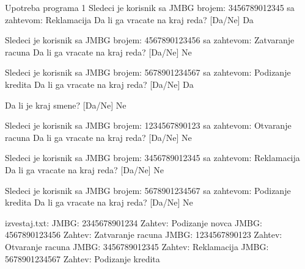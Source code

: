 \begin{Exercise}[label=606]
\begin{maxitest}
\begin{test}{Upotreba programa 1}
Sledeci je korisnik sa JMBG brojem: 3456789012345
sa zahtevom: Reklamacija
        Da li ga vracate na kraj reda? [Da/Ne] Da

Sledeci je korisnik sa JMBG brojem: 4567890123456
sa zahtevom: Zatvaranje racuna
        Da li ga vracate na kraj reda? [Da/Ne] Ne

Sledeci je korisnik sa JMBG brojem: 5678901234567
sa zahtevom: Podizanje kredita
        Da li ga vracate na kraj reda? [Da/Ne] Da

Da li je kraj smene? [Da/Ne] Ne

Sledeci je korisnik sa JMBG brojem: 1234567890123
sa zahtevom: Otvaranje racuna
        Da li ga vracate na kraj reda? [Da/Ne] Ne

Sledeci je korisnik sa JMBG brojem: 3456789012345
sa zahtevom: Reklamacija
        Da li ga vracate na kraj reda? [Da/Ne] Ne

Sledeci je korisnik sa JMBG brojem: 5678901234567
sa zahtevom: Podizanje kredita
        Da li ga vracate na kraj reda? [Da/Ne] Ne

izvestaj.txt: 
  JMBG: 2345678901234     Zahtev: Podizanje novca
  JMBG: 4567890123456     Zahtev: Zatvaranje racuna
  JMBG: 1234567890123     Zahtev: Otvaranje racuna
  JMBG: 3456789012345     Zahtev: Reklamacija
  JMBG: 5678901234567     Zahtev: Podizanje kredita
\end{test}
\end{maxitest}
\end{Exercise}
\begin{Answer}[ref=606]
\end{Answer}


